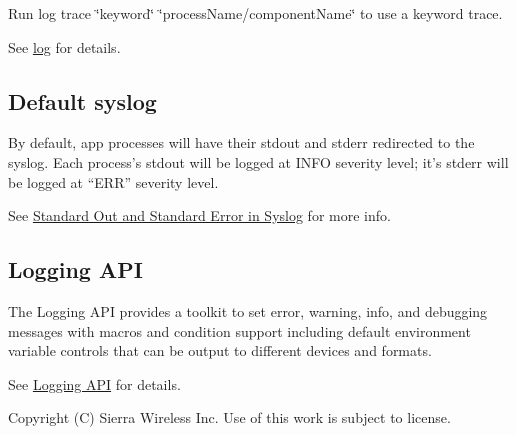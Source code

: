 Run {\ttfamily log trace \char`\"{}keyword\char`\"{} \char`\"{}process\+Name/component\+Name\char`\"{}} to use a keyword trace.

See \hyperlink{toolsTarget_log}{log} for details.\hypertarget{how_to_logs_howToLogs_syslogDefault}{}\subsection{Default syslog}\label{how_to_logs_howToLogs_syslogDefault}
By default, app processes will have their {\ttfamily stdout} and {\ttfamily stderr} redirected to the {\ttfamily syslog}. Each process’s stdout will be logged at I\+N\+F\+O severity level; it’s stderr will be logged at “\+E\+R\+R” severity level.

See \hyperlink{c_logging_c_log_basic_defaultSyslog}{Standard Out and Standard Error in Syslog} for more info.\hypertarget{how_to_logs_howToLogs_api}{}\subsection{Logging A\+P\+I}\label{how_to_logs_howToLogs_api}
The Logging A\+P\+I provides a toolkit to set error, warning, info, and debugging messages with macros and condition support including default environment variable controls that can be output to different devices and formats.

See \hyperlink{c_logging}{Logging A\+P\+I} for details.





Copyright (C) Sierra Wireless Inc. Use of this work is subject to license. 